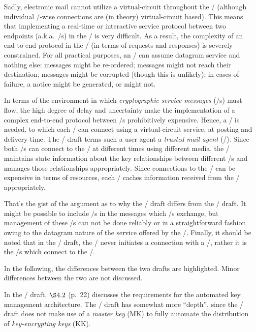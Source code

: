 Sadly, electronic mail cannot utilize a virtual-circuit throughout the \MTS/
(although individual \MTA/-wise connections are (in theory) virtual-circuit
based).
This means that implementing a real-time or interactive
service protocol between two endpoints (a.k.a.~\UA/s)
in the \MTS/ is very difficult.
As a result,
the complexity of an end-to-end protocol in the \MTS/
(in terms of requests and responses)
is severely constrained.
For all practical purposes,
an \MTA/ can assume datagram service and nothing else:
messages might be re-ordered;
messages might not reach their destination;
messages might be corrupted (though this is unlikely);
in cases of failure, a notice might be generated, or might not.

In terms of the environment in which {\it cryptographic service messages}
(\CSM/s) must flow,
the high degree of delay and uncertainty make the implementation of a complex
end-to-end protocol between \UA/s prohibitively expensive.
Hence, a \KDC/ is needed,
to which each \UA/ can connect using a virtual-circuit service,
at posting and delivery time.
The \TTI/ draft terms such a user agent a {\it trusted mail agent} (\TMA/).
Since both \TMA/s can connect to the \KDS/ at different times using different
media,
the \KDS/ maintains state information about the key relationships between
different \TMA/s and manages those relationships appropriately.
Since connections to the \KDS/ can be expensive in terms of resources,
each \TMA/ caches information received from the \KDS/ appropriately.

That's the gist of the argument as to why the \TTI/ draft differs from the
\ansi/ draft.
It might be possible to include \CSM/s in the messages which \UA/s exchange,
but management of these \CSM/s can not be done reliably or in a straightforward
fashion owing to the datagram nature of the service offered by the \MTS/.
Finally, it should be noted that in the \TTI/ draft,
the \KDS/ never initiates a connection with a \TMA/,
rather it is the \TMA/s which connect to the \KDS/.

In the following,
the differences between the two drafts are highlighted.
Minor differences between the two are not discussed.

In the \ansi/ draft,
$\S 4.2$ (p.~22) discusses the requirements for the automated key
management architecture.
The \TTI/ draft has somewhat more ``depth'',
since the \ansi/ draft does not make use of a {\it master key} (MK)
to fully automate the distribution of {\it key-encrypting keys} (KK).

